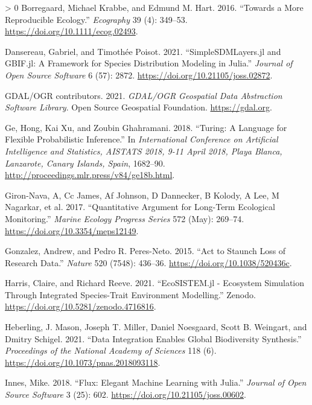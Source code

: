 \documentclass[11pt]{article}
\newlength{\cslhangindent}
\newenvironment{CSLReferences}[3] %
 {%
  \setlength{\parindent}{0pt}
  \ifodd #1 \everypar{\setlength{\hangindent}{\cslhangindent}}\ignorespaces\fi
  \ifnum #2 > 0
  \setlength{\parskip}{#2\baselineskip}
  \fi
 }%
 {}
\begin{document}
\hypertarget{refs}{}
\begin{CSLReferences}{1}{0}
\leavevmode\hypertarget{ref-Borregaard2016MorRep}{}%
Borregaard, Michael Krabbe, and Edmund M. Hart. 2016. {``Towards a More
Reproducible Ecology.''} \emph{Ecography} 39 (4): 349--53.
\url{https://doi.org/10.1111/ecog.02493}.

\leavevmode\hypertarget{ref-Dansereau2021SimJl}{}%
Dansereau, Gabriel, and Timothée Poisot. 2021. {``SimpleSDMLayers.jl and
GBIF.jl: A Framework for Species Distribution Modeling in Julia.''}
\emph{Journal of Open Source Software} 6 (57): 2872.
\url{https://doi.org/10.21105/joss.02872}.

\leavevmode\hypertarget{ref-GDAL}{}%
GDAL/OGR contributors. 2021. \emph{GDAL/OGR Geospatial Data Abstraction
Software Library}. Open Source Geospatial Foundation.
\url{https://gdal.org}.

\leavevmode\hypertarget{ref-Turing}{}%
Ge, Hong, Kai Xu, and Zoubin Ghahramani. 2018. {``Turing: A Language for
Flexible Probabilistic Inference.''} In \emph{International Conference
on Artificial Intelligence and Statistics, AISTATS 2018, 9-11 April
2018, Playa Blanca, Lanzarote, Canary Islands, Spain}, 1682--90.
\url{http://proceedings.mlr.press/v84/ge18b.html}.

\leavevmode\hypertarget{ref-Giron-Nava2017QuaArg}{}%
Giron-Nava, A, Cc James, Af Johnson, D Dannecker, B Kolody, A Lee, M
Nagarkar, et al. 2017. {``Quantitative Argument for Long-Term Ecological
Monitoring.''} \emph{Marine Ecology Progress Series} 572 (May): 269--74.
\url{https://doi.org/10.3354/meps12149}.

\leavevmode\hypertarget{ref-Gonzalez2015ActSta}{}%
Gonzalez, Andrew, and Pedro R. Peres-Neto. 2015. {``Act to Staunch Loss
of Research Data.''} \emph{Nature} 520 (7548): 436--36.
\url{https://doi.org/10.1038/520436c}.

\leavevmode\hypertarget{ref-Harris2021EcoJl}{}%
Harris, Claire, and Richard Reeve. 2021. {``EcoSISTEM.jl - Ecosystem
Simulation Through Integrated Species-Trait Environment Modelling.''}
Zenodo. \url{https://doi.org/10.5281/zenodo.4716816}.

\leavevmode\hypertarget{ref-Heberling2021DatInt}{}%
Heberling, J. Mason, Joseph T. Miller, Daniel Noesgaard, Scott B.
Weingart, and Dmitry Schigel. 2021. {``Data Integration Enables Global
Biodiversity Synthesis.''} \emph{Proceedings of the National Academy of
Sciences} 118 (6). \url{https://doi.org/10.1073/pnas.2018093118}.

\leavevmode\hypertarget{ref-Innes2018FluEle}{}%
Innes, Mike. 2018. {``Flux: Elegant Machine Learning with Julia.''}
\emph{Journal of Open Source Software} 3 (25): 602.
\url{https://doi.org/10.21105/joss.00602}.


\end{CSLReferences}
\end{document}
